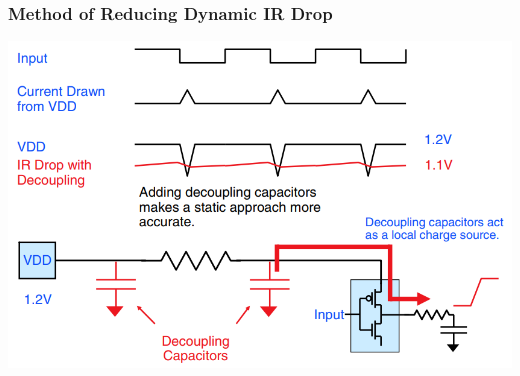 \documentclass{beamer}
\begin{document}
	\begin{frame}
	\frametitle{Method of Reducing Dynamic IR Drop}
		\begin{center}
			\includegraphics[width=\textwidth]{solu}
		\end{center}
	\end{frame}
\end{document}
